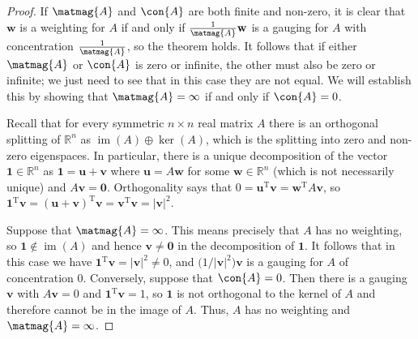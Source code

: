 \documentclass[a4paper, oneside, reqno]{amsart}
\theoremstyle{definition}
\theoremstyle{remark}
\numberwithin{equation}{section}
\renewcommand{\vec}{\mathbf}
\newcommand{\onevector}{\mathbf{1}}
\newcommand{\transpose}{\mathrm{T}}
\DeclareMathOperator{\im}{im}
\newcommand{\R}{\mathbb{R}}
\begin{document}
\begin{proof}
    If \(\matmag{A}\) and \(\con{A}\) are both finite and non-zero, it is clear that \(\vec{w}\) is a weighting for \(A\) if and only if \(\frac{1}{\matmag{A}} \vec{w}\) is a gauging for \(A\) with concentration \(\frac{1}{\matmag{A}}\), so the theorem holds. It follows that if either \(\matmag{A}\) or \(\con{A}\) is zero or infinite, the other must also be zero or infinite; we just need to see that in this case they are not equal. We will establish this by showing that \(\matmag{A} = \infty\) if and only if \(\con{A} = 0\).
    
    Recall that for every symmetric \(n \times n\) real matrix \(A\) there is an orthogonal splitting of \(\R^n\) as \(\im(A) \oplus \ker(A)\), which is the splitting into zero and non-zero eigenspaces.  In particular, there is a unique decomposition of the vector \(\onevector \in \R^n\) as \(\onevector = \vec{u} + \vec{v}\)    where \(\vec{u} = A\vec{w}\) for some \(\vec{w} \in \R^n\) (which is not necessarily unique) and \(A \vec{v} = \vec{0}\). Orthogonality says that \(0 = \vec{u}^\transpose \vec{v} = \vec{w}^\transpose A \vec{v}\), so 
    \(\onevector^\transpose \vec{v} = (\vec{u} + \vec{v})^\transpose \vec{v} =  \vec{v}^\transpose \vec{v} = \left| \vec{v}\right|^2\).

    Suppose that \(\matmag{A} = \infty\). This means precisely that \(A\) has no weighting, so \(\onevector \not \in \im(A)\) and hence \(\vec{v} \not = \vec{0}\) in the decomposition of \(\onevector\). It follows that in this case we have \(\onevector^\transpose \vec{v} = \left| \vec{v}\right|^2 \not = 0 \), and \(\bigl(1/ \left| \vec{v}\right|^2\bigr) \vec{v}\) is a gauging for \(A\) of concentration 0. Conversely, suppose that \(\con{A} = 0\). Then there is a gauging \(\vec{v}\) with \(A \vec{v} = 0\) and \(\onevector^\transpose \vec{v} = 1\), so \(\onevector\) is not orthogonal to the kernel of \(A\) and therefore cannot be in the image of \(A\). Thus, \(A\) has no weighting and \(\matmag{A} = \infty\).
\end{proof}
\end{document}

